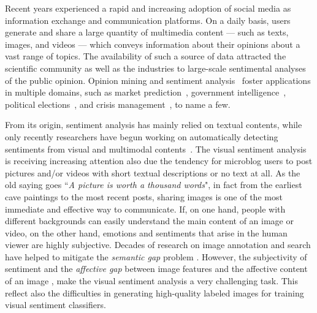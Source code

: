 Recent years experienced a rapid and increasing adoption of social media as information exchange and communication platforms.
On a daily basis, users generate and share a large quantity of multimedia content --- such as texts, images, and videos --- which conveys information about their opinions about a vast range of topics.
The availability of such a source of data attracted the scientific community as well as the industries to large-scale sentimental analyses of the public opinion.
Opinion mining and sentiment analysis~\cite{pang2008opinion} foster applications in multiple domains, such as market prediction~\cite{mishne2006predicting,asur2010predicting}, government intelligence~\cite{abbasi2007affect}, political elections~\cite{laver2003extracting,o2010tweets}, and crisis management~\cite{avvenuti2016impromptu,cresci2015linguistically}, to name a few.

From its origin, sentiment analysis has mainly relied on textual contents, while only recently researchers have begun working on automatically detecting sentiments from visual and multimodal contents~\cite{Borth2013:Large-scale,Cao2016,Jou2015:VisualAffect,siersdorfer2010analyzing,you2015robust,you2016cross}.
The visual sentiment analysis is receiving increasing attention also due the tendency for microblog users to post pictures and/or videos with short textual descriptions or no text at all.
As the old saying goes ``\textit{A picture is worth a thousand words}", in fact from the earliest cave paintings to the most recent posts, sharing images is one of the most immediate and effective way to communicate.
If, on one hand, people with different backgrounds can easily understand the main content of an image or video, on the other hand, emotions and sentiments that arise in the human viewer are highly subjective. Decades of research on image annotation and search have helped to mitigate the \textit{semantic gap} problem \cite{Datta2008,LiUricchio2016}. However, the subjectivity of sentiment and the \textit{affective gap}  between image features and the affective content of an image \cite{siersdorfer2010analyzing},
make the visual sentiment analysis a very challenging task.
This reflect also the difficulties in generating high-quality labeled images for training visual sentiment classifiers.

